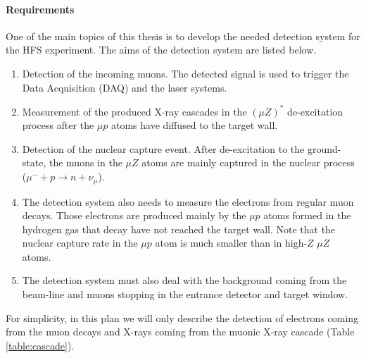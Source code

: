 \documentclass[12pt]{article}
\begin{document}
\paragraph{Requirements}
One of the main topics of this thesis is to develop the needed detection system for the HFS experiment. The aims of the detection system are listed below.
\begin{enumerate}
\item
	Detection of the incoming muons. The detected signal is used to trigger the Data Acquisition (DAQ) and the laser systems. 
\item
	Measurement of the produced X-ray cascades in the $({\mu}Z)^*$ de-excitation process after the ${\mu}p$ atoms have diffused to the target wall.
\item
	Detection of the nuclear capture event. After de-excitation to the ground-state, the muons in the ${\mu}Z$ atoms are mainly captured in the nuclear process (${\mu}^- + p \rightarrow n + {\nu}_{\mu}$).
\item
	The detection system also needs to measure the electrons from regular muon decays. Those electrons are produced mainly by the ${\mu}p$ atoms formed in the hydrogen gas that decay have not reached the target wall. Note that the nuclear capture rate in the ${\mu}p$ atom is much smaller than in high-$Z$ ${\mu}Z$ atoms. 
\item
	The detection system must also deal with the background coming from the beam-line and muons stopping in the entrance detector and target window.
\end{enumerate}
For simplicity, in this plan we will only describe the detection of electrons coming from the muon decays and X-rays coming from the muonic X-ray cascade (Table \ref{table:cascade}).
\end{document}
